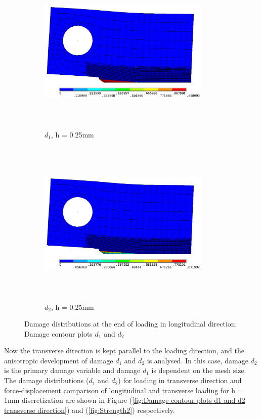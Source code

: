 \documentclass[12pt,a4paper,twoside,openright]{report}
\begin{document}
\begin{figure}[htbp!]\ContinuedFloat
     \begin{subfigure}{0.4\textwidth}
         \includegraphics[width=8.2cm,height=8cm,keepaspectratio]{26.d1-0.25.png}
         \caption{$d_{1}$, h = 0.25mm}
         \label{fig:d1-0.25}
     \end{subfigure}
     \hspace{2cm}
     \begin{subfigure}{0.4\textwidth}
         \includegraphics[width=8.2cm,height=8cm,keepaspectratio]{26.d2-0.25.png}
         \caption{$d_{2}$, h = 0.25mm}
         \label{fig:d2-0.25}
     \end{subfigure}     
        \caption{Damage distributions at the end of loading in longitudinal direction: Damage contour plots $d_{1}$ and $d_{2}$ }
        \label{fig: Damage contour plots d1 and d2}     
\end{figure}
\FloatBarrier 
\indent\indent\indent Now the transverse direction is kept parallel to the loading direction, and the anisotropic development of damage $d_{1}$ and $d_{2}$ is analysed. In this case, damage $d_{2}$ is the primary damage variable and damage $d_{1}$ is dependent on the mesh size.  The damage distributions ($d_{1}$ and $d_{2}$) for loading in transverse direction and force-displacement comparison of  longitudinal and transverse loading for h = 1mm discretization are shown in Figure (\ref{fig:Damage contour plots d1 and d2 transverse direction}) and (\ref{fig:Strength2}) respectively.
\end{document}
